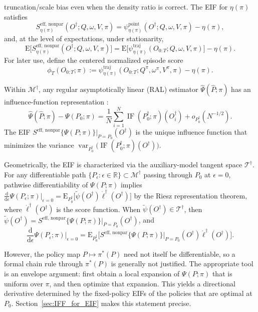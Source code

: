 \documentclass[12pt]{article}
\theoremstyle{remark}\newtheorem{remark}[theorem]{Remark}\theoremstyle{plain}
\newcommand{\E}{\mathrm{E}}
\newcommand{\EIF}{S^{\text{eff, nonpar}}}
\newcommand{\EstFunTraj}{{\psi}^{\text{traj}}}
\newcommand{\EstFunPoi}{{\psi}^{\text{point}}}
\newcommand{\var}{\operatorname{var}}
\begin{document}
truncation/scale bias even when the density ratio is correct.
The EIF for $\eta(\pi)$ satisfies
\[
     \EIF_{\eta(\pi)}(O^\dagger; Q, \omega, V, \pi)
     =\EstFunPoi_{\eta(\pi)}(O^\dagger;Q,\omega,V,\pi)-\eta(\pi),
\]
and, at the level of expectations, under stationarity,
\[
    \E \big[ \EIF_{\eta(\pi)}(O^\dagger; Q, \omega, V, \pi) \big]
    =\E \big[ \EstFunTraj_{\eta(\pi)}(O_{0:T}; Q, \omega, V, \pi) \big]-\eta(\pi).
\]
For later use, define the centered normalized episode score
\begin{equation}\label{eq:centered_episode_score}
    \phi_T(O_{0:T};\pi)
    :=
    \EstFunTraj_{\eta(\pi)}
    (O_{0:T};Q^\pi,\omega^\pi,V^\pi,\pi)-\eta(\pi).
\end{equation}

Within $\mathcal M^\dagger$, any regular asymptotically linear (RAL)
estimator $\widehat{\Psi}(\widehat{P};\pi)$ has an influence-function
representation \citep[IF,][]{tsiatis2006semiparametric}:
\[
    \widehat{\Psi}(\widehat{P}; \pi) - \Psi(P_0; \pi)
    =\frac{1}{N}\sum_{i=1}^{N}
    \operatorname{IF}(P_0^\dagger;\pi)(O_i^\dagger)
    +o_{P_0^\dagger}(N^{-1/2}).
\]
The EIF $\EIF \{ \Psi(P; \pi)\}\big|_{P = P_0}(O^\dagger)$ is the unique influence function that minimizes the variance $\var_{P_0^\dagger} \big( \operatorname{IF}(P_0^\dagger; \pi)(O^\dagger) \big)$.

Geometrically, the EIF is characterized via the auxiliary-model
tangent space $\mathcal{T}^\dagger$. For any differentiable path
$\{P_{\epsilon}:\epsilon\in\mathbb R\}\subset\mathcal M^\dagger$
passing through $P_0$ at $\epsilon=0$, pathwise differentiability of
$\Psi(P;\pi)$ implies
$
    \frac{\mathrm{d}}{\mathrm{d} \epsilon} \Psi(P_{\epsilon}; \pi) \Big|_{\epsilon = 0} = \E_{P_0^\dagger} \Big[ \widetilde{\psi}(O^\dagger) \dot{\ell}^\dagger (O^\dagger) \Big]
$
by the Riesz representation theorem, where $\dot{\ell}^\dagger(O^\dagger)$ is the score function. When $\widetilde{\psi}(O^\dagger) \in \mathcal{T}^\dagger$, then $\widetilde{\psi}(O^\dagger) = \EIF \{ \Psi(P; \pi)\}\big|_{P = P_0}(O^\dagger)$, and
\begin{equation}\label{eq:path_diff}
    \frac{\mathrm{d}}{\mathrm{d} \epsilon} \Psi(P_{\epsilon}; \pi) \Big|_{\epsilon = 0} = \E_{P_0^\dagger} \Big[ \EIF \{ \Psi(P; \pi)\}\big|_{P = P_0}(O^\dagger) \dot{\ell}^\dagger (O^\dagger) \Big].
\end{equation}

However, the policy map $P\mapsto\pi^*(P)$ need not itself be
differentiable, so a formal chain rule through $\pi^*(P)$ is generally
not justified.  The appropriate tool is an envelope argument: first
obtain a local expansion of $\Psi(P;\pi)$ that is uniform over $\pi$,
and then optimize that expansion.  This yields a directional derivative
determined by the fixed-policy EIFs of the policies that are optimal at
$P_0$.  Section~\ref{sec:IFF_for_EIF} makes this statement precise.
\end{document}
